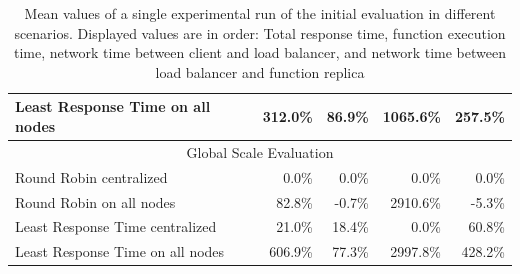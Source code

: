 \documentclass[draft,final]{vutinfth} %
\begin{document}
\begin{table}[]
\begin{tabular}{lrrrr}
Least Response Time on all nodes & 312.0\%                          & 86.9\%                           & 1065.6\%                               & 257.5\%                                \\ \hline
\multicolumn{5}{c}{Global Scale Evaluation}                                                                                                                                              \\ \hline
Round Robin centralized          & 0.0\%                            & 0.0\%                            & 0.0\%                                  & 0.0\%                                  \\
Round Robin on all nodes         & 82.8\%                           & -0.7\%                           & 2910.6\%                               & -5.3\%                                 \\
Least Response Time centralized  & 21.0\%                           & 18.4\%                           & 0.0\%                                  & 60.8\%                                 \\
Least Response Time on all nodes & 606.9\%                          & 77.3\%                           & 2997.8\%                               & 428.2\%                                \\ \hline
\end{tabular}
\caption{Mean values of a single experimental run of the initial evaluation in different scenarios. Displayed values are in order: Total response time, function execution time, network time between client and load balancer, and network time between load balancer and function replica}
\label{tab:initial_eval_results_mean}
\end{table}
\end{document}
